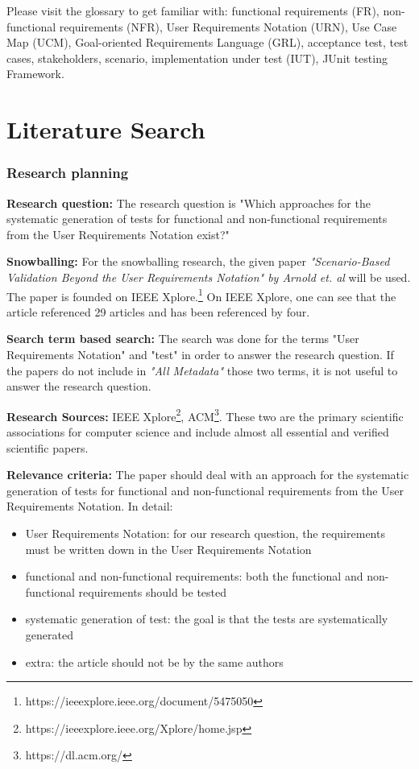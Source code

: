 Please visit the glossary to get familiar with: functional requirements (FR), non-functional requirements (NFR), User Requirements Notation (URN), Use Case Map (UCM), Goal-oriented Requirements Language (GRL), acceptance test, test cases, stakeholders, scenario, implementation under test (IUT), JUnit testing Framework.
\section{Literature Search}

\subsubsection{Research planning} 

\textbf{Research question:} The research question is "Which approaches for the systematic generation of tests for functional and non-functional requirements from the User Requirements Notation exist?"

\textbf{Snowballing:} For the snowballing research, the given paper \textit{"Scenario-Based Validation Beyond the User Requirements Notation" by Arnold et. al} will be used. The paper is founded on IEEE Xplore.\footnote{https://ieeexplore.ieee.org/document/5475050} On IEEE Xplore, one can see that the article referenced 29 articles and has been referenced by four. 

\textbf{Search term based search:} The search was done for the terms "User Requirements Notation" and "test" in order to answer the research question. If the papers do not include in \textit{"All Metadata"} those two terms, it is not useful to answer the research question.

\textbf{Research Sources:} IEEE Xplore\footnote{https://ieeexplore.ieee.org/Xplore/home.jsp}, ACM\footnote{https://dl.acm.org/}. These two are the primary scientific associations for computer science and include almost all essential and verified scientific papers.

\textbf{Relevance criteria:} The paper should deal with an approach for the systematic generation of tests for functional and non-functional requirements from the User Requirements Notation. In detail:
\begin{itemize}
	\itemsep-1em
	\item User Requirements Notation: for our research question, the requirements must be written down in the User Requirements Notation
	\item functional and non-functional requirements: both the functional and non-functional requirements should be tested 
	\item systematic generation of test: the goal is that the tests are systematically generated
	\item extra: the article should not be by the same authors
\end{itemize}

